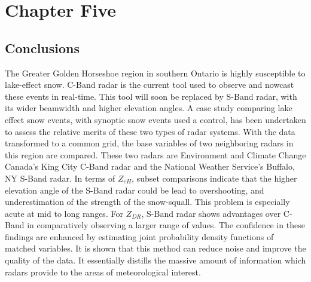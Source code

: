 \chapter{Chapter Five}
\section{Conclusions}
The Greater Golden Horseshoe region in southern Ontario is highly susceptible to lake-effect snow. C-Band radar is the current tool used to observe and nowcast
these events in real-time. This tool will soon be replaced by S-Band radar, with its wider beamwidth and higher elevation angles. A case study comparing lake
effect snow events, with synoptic snow events used a control, has been undertaken to assess the relative merits of these two types of radar systems. With the
data transformed to a common grid, the base variables of two neighboring radars in this region are compared. These two radars are Environment and Climate
Change Canada's King City C-Band radar and the National Weather Service's Buffalo, NY S-Band radar. In terms of $Z_{eH}$, subset comparisons indicate that the
higher elevation angle of the S-Band radar could be lead to overshooting, and underestimation of the strength of the snow-squall. This problem is especially 
acute at mid to long ranges. For $Z_{DR}$, S-Band radar shows advantages over C-Band in comparatively observing a larger range of values. The confidence in 
these findings are enhanced by estimating joint probability density functions of matched variables. It is shown that this method can reduce noise and improve 
the quality of the data. It essentially distills the massive amount of information which radars provide to the areas of meteorological interest.